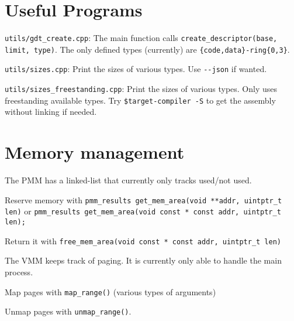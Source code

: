 \documentclass[12pt]{article}
\newcommand{\code}[1]{\colorbox{light-gray}{\texttt{#1}}}
\begin{document}
\section{Useful Programs}
\begin{list}{}{}
\item \code{utils/gdt\_create.cpp}: The main function calls \code{create\_descriptor(base, limit, type)}. The only defined types (currently) are \code{\{code,data\}-ring\{0,3\}}.
\item \code{utils/sizes.cpp}: Print the sizes of various types. Use \code{-{}-json} if wanted.
\item \code{utils/sizes\_freestanding.cpp}: Print the sizes of various types. Only uses freestanding available types. Try \code{\$target-compiler -S} to get the assembly without linking if needed.
\end{list}

\section{Memory management}
\begin{list}{}{}
\item The PMM has a linked-list that currently only tracks used/not used.
\item Reserve memory with \code{pmm\_results get\_mem\_area(void **addr, uintptr\_t len)} or \code{pmm\_results get\_mem\_area(void const * const addr, uintptr\_t len);}
\item Return it with \code{free\_mem\_area(void const * const addr, uintptr\_t len)}
\item The VMM keeps track of paging. It is currently only able to handle the main process.
\item Map pages with \code{map\_range()} (various types of arguments)
\item Unmap pages with \code{unmap\_range()}.
\end{list}
\end{document}
